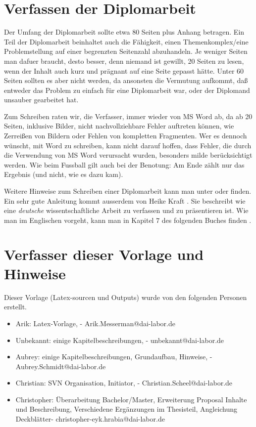 \section{Verfassen der Diplomarbeit}
Der Umfang der Diplomarbeit sollte etwa 80 Seiten plus Anhang betragen. Ein Teil der Diplomarbeit beinhaltet auch die Fähigkeit, einen Themenkomplex/eine Problemstellung auf einer begrenzten Seitenzahl abzuhandeln. Je weniger Seiten man dafuer braucht, desto besser, denn niemand ist gewillt, 20 Seiten zu lesen, wenn der Inhalt auch kurz und prägnant auf eine Seite gepasst hätte. Unter 60 Seiten sollten es aber nicht werden, da ansonsten die Vermutung aufkommt, daß entweder das Problem zu einfach für eine Diplomarbeit war, oder der Diplomand unsauber gearbeitet hat.

Zum Schreiben raten wir, die Verfasser, immer wieder von MS Word ab, da ab 20 Seiten, inklusive Bilder, nicht nachvollziehbare Fehler auftreten können, wie Zerreißen von Bildern oder Fehlen von kompletten Fragmenten. Wer es dennoch wünscht, mit Word zu schreiben, kann nicht darauf hoffen, dass Fehler, die durch die Verwendung von MS Word verursacht wurden, besonders milde berücksichtigt werden. Wie beim Fussball gilt auch bei der Benotung: Am Ende zählt nur das Ergebnis (und nicht, wie es dazu kam).

Weitere Hinweise zum Schreiben einer Diplomarbeit kann man unter \cite{wiwi07} oder \cite{Boettcher2004} finden. Ein sehr gute Anleitung kommt ausserdem von Heike Kraft \cite{kraft06}. Sie beschreibt wie eine {\em deutsche} wissentschaftliche Arbeit zu verfassen und zu präsentieren ist. Wie man im Englischen vorgeht, kann man in Kapitel $7$ des folgenden Buches finden \cite{schut07}.

\section{Verfasser dieser Vorlage und Hinweise}
Dieser Vorlage (Latex-sourcen und Outputs) wurde von den folgenden Personen erstellt.
\begin{itemize}
\item Arik: Latex-Vorlage, - Arik.Messerman@dai-labor.de 
\item Unbekannt: einige Kapitelbeschreibungen, - unbekannt@dai-labor.de
\item Aubrey: einige Kapitelbeschreibungen, Grundaufbau, Hinweise, - Aubrey.Schmidt@dai-labor.de
\item Christian: SVN Organisation, Initiator, - Christian.Scheel@dai-labor.de
\item Christopher: Überarbeitung Bachelor/Master, Erweiterung Proposal Inhalte und Beschreibung, Verschiedene Ergänzungen im Thesisteil, Angleichung Deckblätter- christopher-eyk.hrabia@dai-labor.de
\end{itemize}

